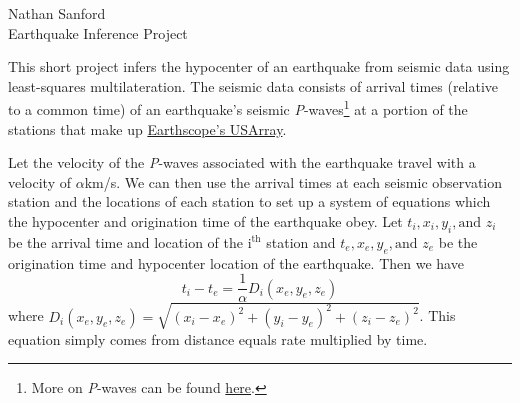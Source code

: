 \documentclass[12pt]{article}
\begin{document}
\pagestyle{plain}



{\centering \Large Nathan Sanford\\
Earthquake Inference Project\\}
\vspace{0.5cm}

This short project infers the hypocenter of an earthquake from seismic data using least-squares multilateration.
The seismic data consists of arrival times (relative to a common time) of an earthquake's seismic \textit{P}-waves\footnote{More on \textit{P}-waves can be found \href{https://en.wikipedia.org/wiki/P-wave}{here}.} at a portion of the stations that make up \href{http://www.usarray.org}{Earthscope’s USArray}.

Let the velocity of the \textit{P}-waves associated with the earthquake travel with a velocity of $\alpha$km/s. We can then use the arrival times at each seismic observation station and the locations of each station to set up a system of equations which the hypocenter and origination time of the earthquake obey. Let $t_i, x_i, y_i, \text{and } z_i$ be the arrival time and location of the $\text{i}^{\text{th}}$ station and $t_e, x_e, y_e, \text{and } z_e$ be the origination time and hypocenter location of the earthquake. Then we have 
\begin{equation}
\label{fulldist}
t_i-t_e=\frac{1}{\alpha}D_i(x_e,y_e,z_e)
\end{equation}
where $D_i(x_e,y_e,z_e)=\sqrt{(x_i-x_e)^2+(y_i-y_e)^2+(z_i-z_e)^2}$. This equation simply comes from distance equals rate multiplied by time. 
\end{document}
